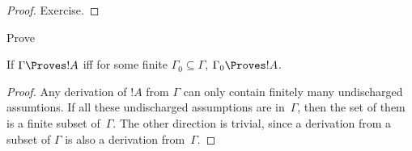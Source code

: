 \documentclass[../../include/open-logic-section]{subfiles}
\begin{document}
\begin{proof}
Exercise.
\end{proof}

\begin{prob}
Prove 
\end{prob}

\begin{prop}
If $\Gamma \Proves !A$ iff for some finite $\Gamma_0 \subseteq
\Gamma$, $\Gamma_0 \Proves !A$.
\end{prop}

\begin{proof}
Any derivation of $!A$ from $\Gamma$ can only contain finitely many
undischarged assumtions.  If all these undischarged assumptions are
in~$\Gamma$, then the set of them is a finite subset of~$\Gamma$.  The
other direction is trivial, since a derivation from a subset of
$\Gamma$ is also a derivation from~$\Gamma$.
\end{proof}
\end{document}
